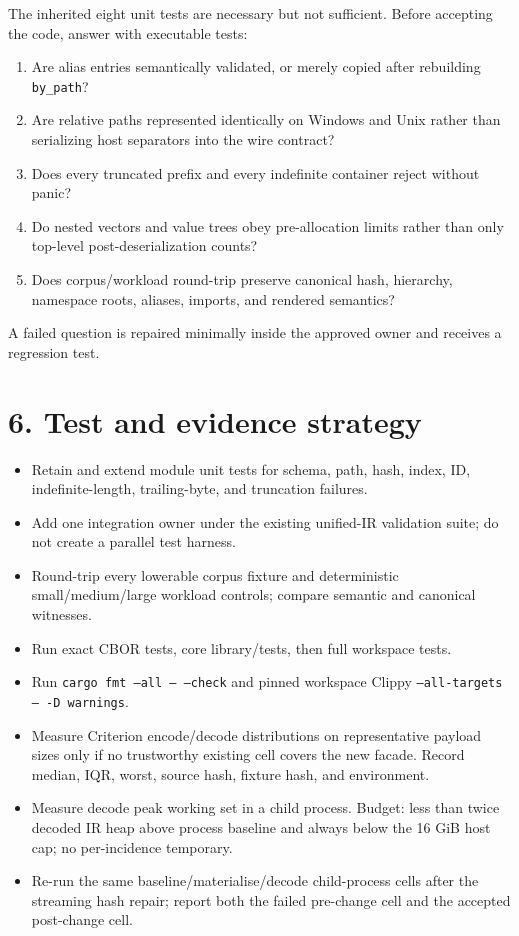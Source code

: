 \documentclass[11pt,a4paper]{article}
\begin{document}
The inherited eight unit tests are necessary but not sufficient. Before accepting the code, answer
with executable tests:

\begin{enumerate}
  \item Are alias entries semantically validated, or merely copied after rebuilding \texttt{by\_path}?
  \item Are relative paths represented identically on Windows and Unix rather than serializing host
        separators into the wire contract?
  \item Does every truncated prefix and every indefinite container reject without panic?
  \item Do nested vectors and value trees obey pre-allocation limits rather than only top-level
        post-deserialization counts?
  \item Does corpus/workload round-trip preserve canonical hash, hierarchy, namespace roots, aliases,
        imports, and rendered semantics?
\end{enumerate}

A failed question is repaired minimally inside the approved owner and receives a regression test.

\section*{6. Test and evidence strategy}

\begin{itemize}
  \item Retain and extend module unit tests for schema, path, hash, index, ID, indefinite-length,
        trailing-byte, and truncation failures.
  \item Add one integration owner under the existing unified-IR validation suite; do not create a
        parallel test harness.
  \item Round-trip every lowerable corpus fixture and deterministic small/medium/large workload
        controls; compare semantic and canonical witnesses.
  \item Run exact CBOR tests, core library/tests, then full workspace tests.
  \item Run \texttt{cargo fmt --all -- --check} and pinned workspace Clippy
        \texttt{--all-targets -- -D warnings}.
  \item Measure Criterion encode/decode distributions on representative payload sizes only if no
        trustworthy existing cell covers the new facade. Record median, IQR, worst, source hash,
        fixture hash, and environment.
  \item Measure decode peak working set in a child process. Budget: less than twice decoded IR heap
        above process baseline and always below the 16 GiB host cap; no per-incidence temporary.
  \item Re-run the same baseline/materialise/decode child-process cells after the streaming hash
        repair; report both the failed pre-change cell and the accepted post-change cell.
\end{itemize}
\end{document}
